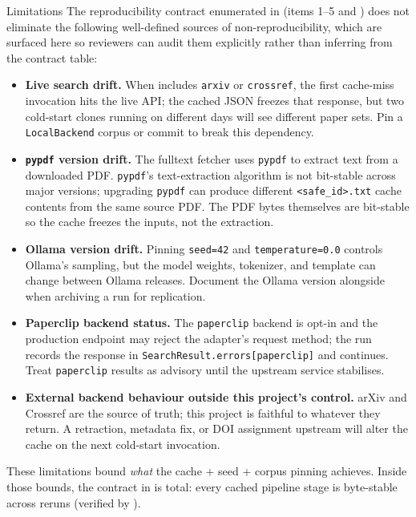 \documentclass[
  ignorenonframetext,
]{beamer}
\providecommand{\tightlist}{%
  \setlength{\itemsep}{0pt}\setlength{\parskip}{0pt}}
\begin{document}
\begin{frame}{Limitations}
\protect{}\label{limitations}
The reproducibility contract enumerated in 
(items 1--5 and ) does not eliminate the following
well-defined sources of non-reproducibility, which are surfaced here so
reviewers can audit them explicitly rather than inferring from the
contract table:

\begin{itemize}
\tightlist
\item
  \textbf{Live search drift.} When
   includes \texttt{arxiv} or
  \texttt{crossref}, the first cache-miss invocation hits the live API;
  the cached JSON freezes that response, but two cold-start clones
  running on different days will see different paper sets. Pin a
  \texttt{LocalBackend} corpus or commit 
  to break this dependency.
\item
  \textbf{\texttt{pypdf} version drift.} The fulltext fetcher uses
  \texttt{pypdf} to extract text from a downloaded PDF. \texttt{pypdf}'s
  text-extraction algorithm is not bit-stable across major versions;
  upgrading \texttt{pypdf} can produce different
  \texttt{\textless{}safe\_id\textgreater{}.txt} cache contents from the
  same source PDF. The PDF bytes themselves are bit-stable so the cache
  freezes the inputs, not the extraction.
\item
  \textbf{Ollama version drift.} Pinning \texttt{seed=42} and
  \texttt{temperature=0.0} controls Ollama's sampling, but the model
  weights, tokenizer, and template can change between Ollama releases.
  Document the Ollama version alongside  when
  archiving a run for replication.
\item
  \textbf{Paperclip backend status.} The \texttt{paperclip} backend is
  opt-in and the production endpoint may reject the adapter's request
  method; the run records the response in
  \texttt{SearchResult.errors{[}paperclip{]}} and continues. Treat
  \texttt{paperclip} results as advisory until the upstream service
  stabilises.
\item
  \textbf{External backend behaviour outside this project's control.}
  arXiv and Crossref are the source of truth; this project is faithful
  to whatever they return. A retraction, metadata fix, or DOI assignment
  upstream will alter the cache on the next cold-start invocation.
\end{itemize}

These limitations bound \emph{what} the cache + seed + corpus pinning
achieves. Inside those bounds, the contract in  is
total: every cached pipeline stage is byte-stable across reruns
(verified by
).
\end{frame}
\end{document}

